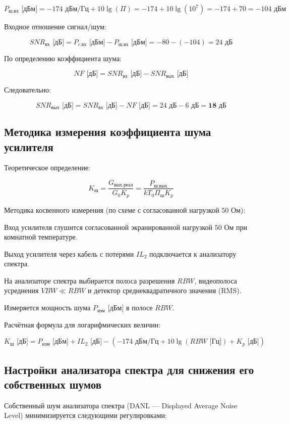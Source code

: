 $$P_{\text{ш.вх}}\text{ [дБм]} = -174\text{ дБм/Гц} + 10\lg(\Pi) = -174 + 10\lg(10^7) = -174 + 70 = -104\text{ дБм}$$

Входное отношение сигнал/шум:


$$SNR_{\text{вх}}\text{ [дБ]} = P_{c.\text{вх}}\text{ [дБм]} - P_{\text{ш.вх}}\text{ [дБм]} = -80 - (-104) = 24\text{ дБ}$$

По определению коэффициента шума:


$$NF\text{ [дБ]} = SNR_{\text{вх}}\text{ [дБ]} - SNR_{\text{вых}}\text{ [дБ]}$$


Следовательно:


$$SNR_{\text{вых}}\text{ [дБ]} = SNR_{\text{вх}}\text{ [дБ]} - NF\text{ [дБ]} = 24\text{ дБ} - 6\text{ дБ} = \mathbf{18\text{ дБ}}$$

\subsection* {Методика измерения коэффициента шума усилителя}

Теоретическое определение:


$$K_{\text{ш}} = \frac{G_{\text{вых.реал}}}{G_0 K_p} = \frac{P_{\text{ш.вых}}}{k T_0 \Pi_{\text{ш}} K_p}$$

Методика косвенного измерения (по схеме с согласованной нагрузкой $50\text{ Ом}$):

Вход усилителя глушится согласованной экранированной нагрузкой $50\text{ Ом}$ при комнатной температуре.

Выход усилителя через кабель с потерями $IL_2$ подключается к анализатору спектра.

На анализаторе спектра выбирается полоса разрешения $RBW$, видеополоса усреднения $VBW \ll RBW$ и детектор среднеквадратичного значения (RMS).

Измеряется мощность шума $P_{\text{изм}}$ [дБм] в полосе $RBW$.

Расчётная формула для логарифмических величин:


$$K_{\text{ш}}\text{ [дБ]} = P_{\text{изм}}\text{ [дБм]} + IL_2\text{ [дБ]} - \left( -174\text{ дБм/Гц} + 10\lg(RBW\text{ [Гц]}) + K_p\text{ [дБ]} \right)$$

\subsection* {Настройки анализатора спектра для снижения его собственных шумов}

Собственный шум анализатора спектра (DANL — Displayed Average Noise Level) минимизируется следующими регулировками:

